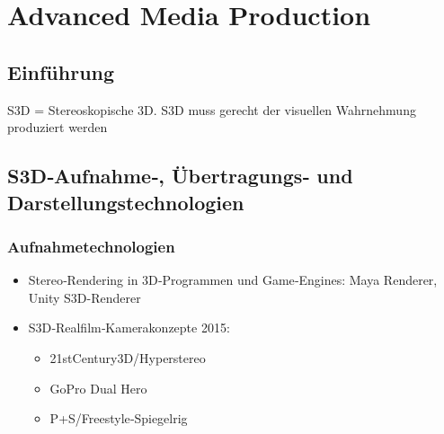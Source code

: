 \chapter{Advanced Media Production}
\section{Einführung}\label{sec:Einführung_AMP}

S3D = Stereoskopische 3D. S3D muss gerecht der visuellen Wahrnehmung produziert werden\\


\section{S3D‐Aufnahme‐, Übertragungs‐ und Darstellungstechnologien}

\subsection{Aufnahmetechnologien}
\begin{itemize}

\item Stereo‐Rendering in 3D‐Programmen und Game‐Engines: Maya Renderer, Unity S3D-Renderer
\item S3D‐Realfilm‐Kamerakonzepte 2015:
\begin{itemize}
\item 21stCentury3D/Hyperstereo
\item GoPro Dual Hero
\item P+S/Freestyle‐Spiegelrig
\end{itemize}

\end{itemize}

